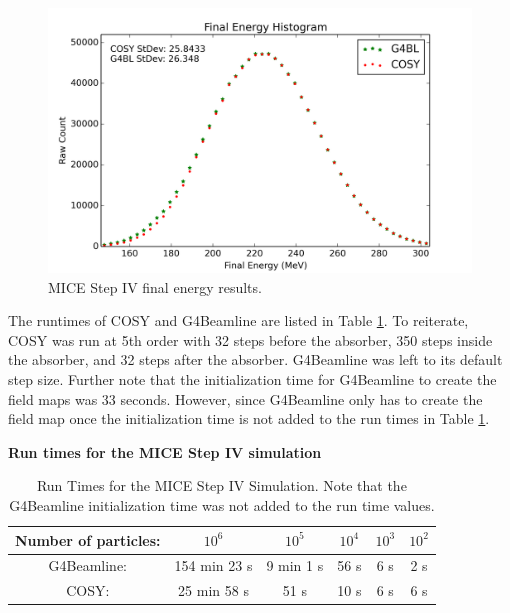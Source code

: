 \begin{figure}[h!]
  \centering
    \includegraphics[width=\textwidth]{MICE data/MICE_1M_energy} 
  \caption{MICE Step IV final energy results.}
  \label{fig:miceenergy}
\end{figure}

The runtimes of COSY and G4Beamline are listed in Table \ref{tbl:mice_times}. To reiterate, COSY was run at 5th order with 32 steps before the absorber, 350 steps inside the absorber, and 32 steps after the absorber. G4Beamline was left to its default step size. Further note that the initialization time for G4Beamline to create the field maps was 33 seconds. However, since G4Beamline only has to create the field map once the initialization time is not added to the run times in Table \ref{tbl:mice_times}.

\begin{table}
\caption*{\textbf{Run times for the MICE Step IV simulation}}
\begin{center}
\begin{tabularx}{0.8\textwidth}{cccccc}
\hline \hline
Number of particles: & $10^6$ & $10^5$ & $10^4$ & $10^3$ & $10^2$\\
\hline
G4Beamline: & 154 min 23 s & 9 min 1 s & 56 s & 6 s & 2 s\vspace{-12pt}\\
COSY: & 25 min 58 s & 51 s & 10 s & 6 s & 6 s\\
\hline
\end{tabularx}
\end{center}
\caption[Run Times for the MICE Step IV Simulation.]{Run Times for the MICE Step IV Simulation. Note that the G4Beamline initialization time was not added to the run time values.}
\label{tbl:mice_times}
\end{table}

